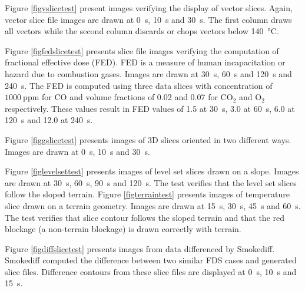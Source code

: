 \documentclass[11pt,twoside]{book}
\begin{document}
Figure \ref{figvslicetest} present images verifying the display of vector slices. Again, vector slice file images are drawn at \SI{0}{s}, \SI{10}{s} and \SI{30}{s}. The first column draws all vectors while the second column discards or chops vectors below \SI{140}{\degreeCelsius}.

Figure \ref{figfedslicetest} presents slice file images verifying the computation of fractional effective dose (FED).  FED is a measure of human incapacitation or hazard due to combustion gases\cite{SFPE:Purser}. Images are drawn at \SI{30}{s}, \SI{60}{s} and \SI{120}{s} and \SI{240}{s}. The FED is computed using three data slices with concentration of $1000~\mathrm{ppm}$ for $\mathrm{CO}$ and volume fractions of 0.02 and 0.07 for $\mathrm{CO_2}$ and $\mathrm{O_2}$ respectively. These values result in FED values of 1.5 at \SI{30}{s}, 3.0 at \SI{60}{s}, 6.0 at \SI{120}{s} and 12.0 at \SI{240}{s}.

Figure \ref{figgslicetest} presents images of 3D slices oriented in two different ways. Images are drawn at \SI{0}{s}, \SI{10}{s} and \SI{30}{s}.

Figure \ref{figlevelsettest} presents images of level set slices drawn on a slope. Images are drawn at \SI{30}{s}, \SI{60}{s}, \SI{90}{s} and \SI{120}{s}.  The test verifies that the level set slices follow the sloped terrain.
Figure \ref{figterraintest} presents images of temperature slice drawn on a terrain geometry. Images are drawn at \SI{15}{s}, \SI{30}{s}, \SI{45}{s} and \SI{60}{s}.  The test verifies that slice contour follows the sloped terrain and that the red blockage (a non-terrain blockage) is drawn correctly with terrain.

Figure \ref{figdiffslicetest} presents images from data differenced by Smokediff.  Smokediff computed the difference between two similar FDS cases and generated slice files. Difference contours from these slice files are displayed at \SI{0}{s}, \SI{10}{s} and \SI{15}{s}.
\end{document}
